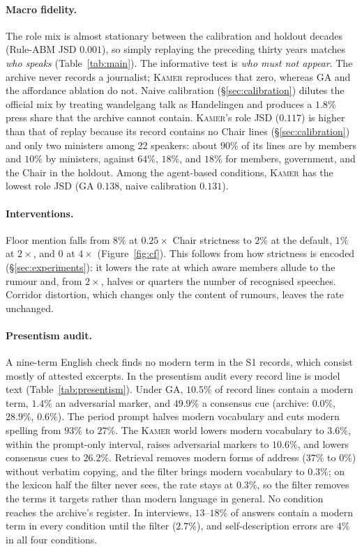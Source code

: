 \documentclass[sigconf,review,anonymous]{acmart}
\newcommand{\sys}{\textsc{Kamer}}
\begin{document}
\paragraph{Macro fidelity.} The role mix is almost stationary between the
calibration and holdout decades (Rule-ABM JSD $0.001$), so simply
replaying the preceding thirty years matches \emph{who speaks}
(Table~\ref{tab:main}). The informative test is \emph{who must not
appear}. The archive never records a journalist; \sys{} reproduces that
zero, whereas GA and the affordance ablation do not. Naive calibration
(\S\ref{sec:calibration}) dilutes the official mix by treating wandelgang
talk as Handelingen and produces a $1.8\%$ press share that the archive
cannot contain. \sys{}'s role JSD ($0.117$) is higher than that of replay
because its record contains no Chair lines (\S\ref{sec:calibration}) and only
two ministers among 22 speakers: about $90\%$ of its lines are by members
and $10\%$ by ministers, against $64\%$, $18\%$, and $18\%$ for members,
government, and the Chair in the holdout. Among the agent-based
conditions, \sys{} has the lowest role JSD (GA $0.138$, naive calibration
$0.131$).



\paragraph{Interventions.} Floor mention falls from $8\%$ at
$0.25\times$ Chair strictness to $2\%$ at the default, $1\%$ at
$2\times$, and $0$ at $4\times$ (Figure~\ref{fig:cf}). This follows from how
strictness is encoded (\S\ref{sec:experiments}): it lowers the rate at
which aware members allude to the rumour and, from $2\times$, halves or
quarters the number of recognised speeches. Corridor distortion, which
changes only the content of rumours, leaves the rate unchanged.

\paragraph{Presentism audit.} A nine-term English check finds no modern
term in the S1 records, which consist mostly of attested excerpts. In the
presentism audit every record line is model text
(Table~\ref{tab:presentism}). Under GA, $10.5\%$ of record lines contain
a modern term, $1.4\%$ an adversarial marker, and $49.9\%$ a consensus
cue (archive: $0.0\%$, $28.9\%$, $0.6\%$). The period prompt halves
modern vocabulary and cuts modern spelling from $93\%$ to $27\%$. The
\sys{} world lowers modern vocabulary to $3.6\%$, within the prompt-only
interval, raises adversarial markers to $10.6\%$, and lowers consensus
cues to $26.2\%$. Retrieval removes modern forms of address ($37\%$ to
$0\%$) without verbatim copying, and the filter brings modern vocabulary
to $0.3\%$; on the lexicon half the filter never sees, the rate stays at
$0.3\%$, so the filter removes the terms it targets rather than modern
language in general. No condition reaches the archive's register. In
interviews, $13$--$18\%$ of answers contain a modern term in every
condition until the filter ($2.7\%$), and self-description errors are
$4\%$ in all four conditions.
\end{document}
